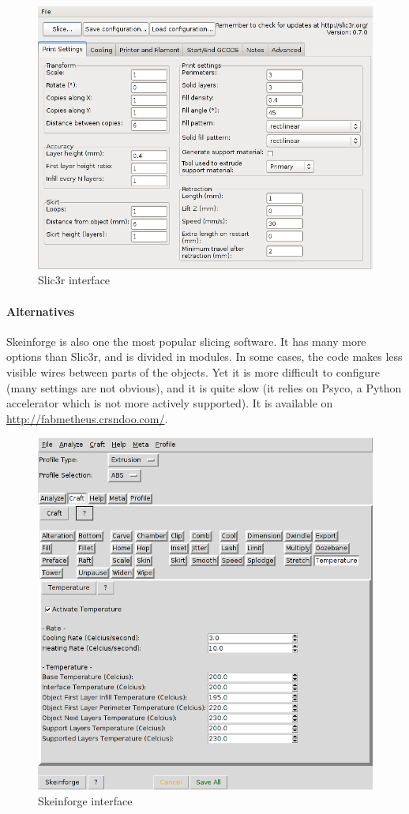 \documentclass{article}
\begin{document}
	\begin{figure}[h!]
		\centering
		\includegraphics[width=0.6\linewidth]{slic3r.png}
		\caption{Slic3r interface}
	\end{figure}

	\paragraph{Alternatives} Skeinforge is also one the most popular slicing software. It has many more options than Slic3r, and is divided in modules. In some cases, the code makes less visible wires between parts of the objects. Yet it is more difficult to configure (many settings are not obvious), and it is quite slow (it relies on Psyco, a Python accelerator which is not more actively supported). It is available on \url{http://fabmetheus.crsndoo.com/}.

	\begin{figure}[h!]
		\centering
		\includegraphics[width=0.6\linewidth]{skeinforge.png}
		\caption{Skeinforge interface}
	\end{figure}

\newpage
\end{document}
